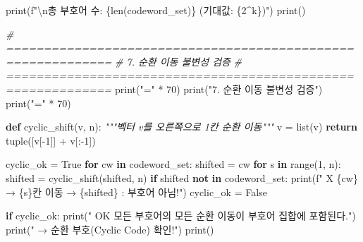 \documentclass[
  oneside]{article}
\newenvironment{Shaded}{}{}
\newcommand{\BuiltInTok}[1]{\textcolor[rgb]{0.00,0.50,0.00}{#1}}
\newcommand{\CharTok}[1]{\textcolor[rgb]{0.25,0.44,0.63}{#1}}
\newcommand{\CommentTok}[1]{\textcolor[rgb]{0.38,0.63,0.69}{\textit{#1}}}
\newcommand{\ControlFlowTok}[1]{\textcolor[rgb]{0.00,0.44,0.13}{\textbf{#1}}}
\newcommand{\DecValTok}[1]{\textcolor[rgb]{0.25,0.63,0.44}{#1}}
\newcommand{\KeywordTok}[1]{\textcolor[rgb]{0.00,0.44,0.13}{\textbf{#1}}}
\newcommand{\NormalTok}[1]{#1}
\newcommand{\OperatorTok}[1]{\textcolor[rgb]{0.40,0.40,0.40}{#1}}
\newcommand{\SpecialCharTok}[1]{\textcolor[rgb]{0.25,0.44,0.63}{#1}}
\newcommand{\SpecialStringTok}[1]{\textcolor[rgb]{0.73,0.40,0.53}{#1}}
\newcommand{\StringTok}[1]{\textcolor[rgb]{0.25,0.44,0.63}{#1}}
\newcommand{\VariableTok}[1]{\textcolor[rgb]{0.10,0.09,0.49}{#1}}
\begin{document}
\begin{Shaded}
\begin{Highlighting}[]
\BuiltInTok{print}\NormalTok{(}\SpecialStringTok{f"}\CharTok{\textbackslash{}n}\SpecialStringTok{총 부호어 수: }\SpecialCharTok{\{}\BuiltInTok{len}\NormalTok{(codeword\_set)}\SpecialCharTok{\}}\SpecialStringTok{ (기대값: }\SpecialCharTok{\{}\DecValTok{2}\OperatorTok{\^{}}\NormalTok{k}\SpecialCharTok{\}}\SpecialStringTok{)"}\NormalTok{)}
\BuiltInTok{print}\NormalTok{()}

\CommentTok{\# ============================================================}
\CommentTok{\# 7. 순환 이동 불변성 검증}
\CommentTok{\# ============================================================}
\BuiltInTok{print}\NormalTok{(}\StringTok{"="} \OperatorTok{*} \DecValTok{70}\NormalTok{)}
\BuiltInTok{print}\NormalTok{(}\StringTok{"7. 순환 이동 불변성 검증"}\NormalTok{)}
\BuiltInTok{print}\NormalTok{(}\StringTok{"="} \OperatorTok{*} \DecValTok{70}\NormalTok{)}

\KeywordTok{def}\NormalTok{ cyclic\_shift(v, n):}
    \CommentTok{"""벡터 v를 오른쪽으로 1칸 순환 이동"""}
\NormalTok{    v }\OperatorTok{=} \BuiltInTok{list}\NormalTok{(v)}
    \ControlFlowTok{return} \BuiltInTok{tuple}\NormalTok{([v[}\OperatorTok{{-}}\DecValTok{1}\NormalTok{]] }\OperatorTok{+}\NormalTok{ v[:}\OperatorTok{{-}}\DecValTok{1}\NormalTok{])}

\NormalTok{cyclic\_ok }\OperatorTok{=} \VariableTok{True}
\ControlFlowTok{for}\NormalTok{ cw }\KeywordTok{in}\NormalTok{ codeword\_set:}
\NormalTok{    shifted }\OperatorTok{=}\NormalTok{ cw}
    \ControlFlowTok{for}\NormalTok{ s }\KeywordTok{in} \BuiltInTok{range}\NormalTok{(}\DecValTok{1}\NormalTok{, n):}
\NormalTok{        shifted }\OperatorTok{=}\NormalTok{ cyclic\_shift(shifted, n)}
        \ControlFlowTok{if}\NormalTok{ shifted }\KeywordTok{not} \KeywordTok{in}\NormalTok{ codeword\_set:}
            \BuiltInTok{print}\NormalTok{(}\SpecialStringTok{f"  X }\SpecialCharTok{\{}\NormalTok{cw}\SpecialCharTok{\}}\SpecialStringTok{ → }\SpecialCharTok{\{}\NormalTok{s}\SpecialCharTok{\}}\SpecialStringTok{칸 이동 → }\SpecialCharTok{\{}\NormalTok{shifted}\SpecialCharTok{\}}\SpecialStringTok{ : 부호어 아님!"}\NormalTok{)}
\NormalTok{            cyclic\_ok }\OperatorTok{=} \VariableTok{False}

\ControlFlowTok{if}\NormalTok{ cyclic\_ok:}
    \BuiltInTok{print}\NormalTok{(}\StringTok{"  OK 모든 부호어의 모든 순환 이동이 부호어 집합에 포함된다."}\NormalTok{)}
    \BuiltInTok{print}\NormalTok{(}\StringTok{"  → 순환 부호(Cyclic Code) 확인!"}\NormalTok{)}
\BuiltInTok{print}\NormalTok{()}


\end{Highlighting}
\end{Shaded}
\end{document}
